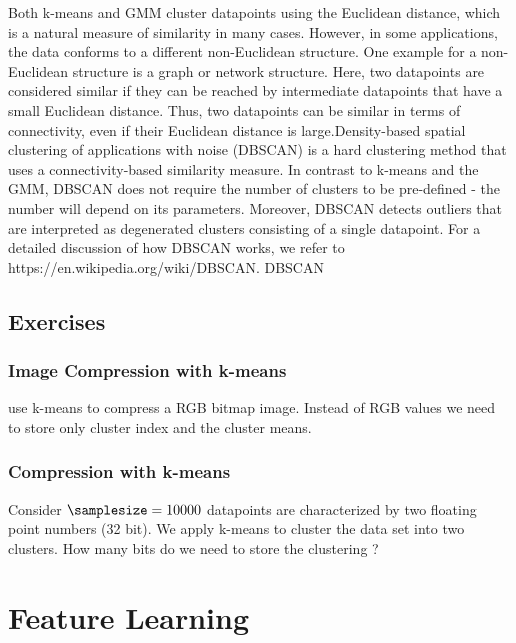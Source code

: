 \documentclass[12pt]{report}
\begin{document}
Both k-means and GMM cluster datapoints using the Euclidean distance, 
which is a natural measure of similarity in many cases. However, in some 
applications, the data conforms to a different non-Euclidean structure. 
One example for a non-Euclidean structure is a graph or network structure. 
Here, two datapoints are considered similar if they can be reached by 
intermediate datapoints that have a small Euclidean distance. Thus, 
two datapoints can be similar in terms of connectivity, even if their 
Euclidean distance is large.Density-based spatial clustering of 
applications with noise (DBSCAN) is a hard clustering method that 
uses a connectivity-based similarity measure. In contrast to k-means 
and the GMM, DBSCAN does not require the number of clusters to 
be pre-defined -  the number will depend on its parameters. Moreover, 
DBSCAN detects outliers that are interpreted as degenerated clusters 
consisting of a single datapoint. For a detailed discussion of how 
DBSCAN works, we refer to https://en.wikipedia.org/wiki/DBSCAN.  DBSCAN 

\section{Exercises} 
\subsection{Image Compression with k-means} 
use k-means to compress a RGB bitmap image. Instead of RGB values 
we need to store only cluster index and the cluster means. 

\subsection{Compression with k-means} 
Consider $\samplesize=10000$ datapoints are characterized by two 
floating point numbers (32 bit). We apply k-means to cluster the 
data set into two clusters. How many bits do we need to store the 
clustering ? 


\newpage
\chapter{Feature Learning} 
\label{ch_FeatureLearning}
\end{document}
